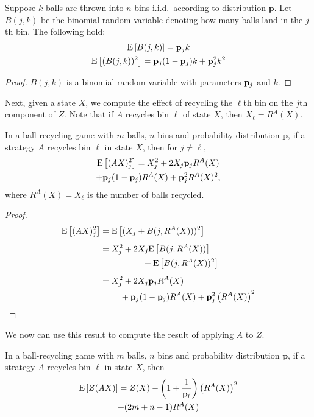 \begin{lemma}
	Suppose $k$ balls are thrown into $n$ bins i.i.d.\ according to distribution
	$\mathbf{p}$. Let $B(j,k)$ be the binomial random variable denoting how
	many balls land in the $j$th bin.  The following hold:
	\begin{gather}
		\mathrm{E}\left[B(j,k)\right] = \mathbf{p}_jk \\
		\mathrm{E}\left[(B(j,k))^2\right] = \mathbf{p}_j(1-\mathbf{p}_j)k + \mathbf{p}_j^2k^2
	\end{gather}
\end{lemma}

\begin{proof}
	$B(j,k)$ is a binomial random variable with parameters $\mathbf{p}_j$ and $k$.
\end{proof}

Next, given a state $X$, we compute the effect of recycling the $\ell$th bin on
the $j$th component of $Z$. Note that if $A$ recycles bin $\ell$ of state $X$,
then $X_\ell = R^A(X)$.
\begin{lemma}
	In a ball-recycling game with $m$ balls, $n$ bins and probability
	distribution $\mathbf{p}$, if a strategy $A$ recycles bin $\ell$ in state
	$X$, then for $j \neq \ell$,
	\begin{multline}
		\mathrm{E}\left[(AX)_j^2\right]=X_j^2 + 2X_j\mathbf{p}_jR^A(X) \\
		+ \mathbf{p}_j(1-\mathbf{p}_j)R^A(X) + \mathbf{p}_j^2R^A(X)^2,
	\end{multline}
	where $R^A(X) = X_\ell$ is the number of balls recycled.
\end{lemma}

\begin{proof}
	\begin{align*}
		\E{(AX)_j^2} &= \E{(X_j+B(j,R^A(X)))^2} \\[1ex]
					 &= \begin{multlined}[t] X_j^2 + 2X_j\E{B(j,R^A(X))}\\
						 +\E{B(j,R^A(X))^2} \end{multlined} \\[1ex]
					 &= \begin{multlined}[t] X_j^2 + 2X_j\p_jR^A(X)\\+\p_j(1-\p_j)R^A(X)
						 + \p_j^2\left(R^A(X)\right)^2 \end{multlined}
	\end{align*}
\end{proof}

We now can use this result to compute the result of applying $A$ to $Z$. 
\begin{lemma}
	In a ball-recycling game with $m$ balls, $n$ bins and probability
	distribution $\mathbf{p}$, if a strategy $A$ recycles bin $\ell$ in state
	$X$, then
	\begin{multline}
		\mathrm{E}\left[Z(AX)\right]=Z(X) - \left(1+\frac{1}{\mathbf{p}_\ell}\right)\left(R^A(X)\right)^2 \\
		+ (2m+n-1)R^A(X)
	\end{multline}
\end{lemma}

